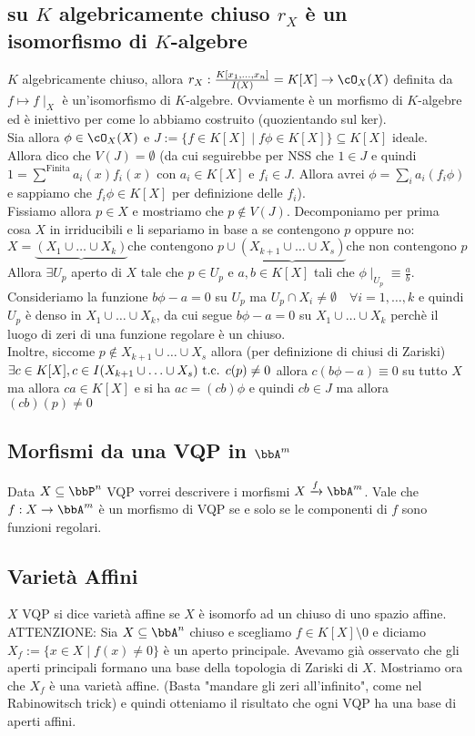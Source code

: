 \documentclass[a4paper,NoNotes,GeneralMath]{stdmdoc}
\newcommand{\xrar}{\xrightarrow}
\begin{document}
	\subsection*{su $K$ algebricamente chiuso $r_X$ è un isomorfismo di $K$-algebre}
	$K$ algebricamente chiuso, allora $r_X : \frac{K[x_1, \ldots, x_n]}{I(X)} = K[X] \rar \cO_X(X)$ definita da $f \mapsto f\mid_X$ è un'isomorfismo di $K$-algebre. Ovviamente è un morfismo di $K$-algebre ed è iniettivo per come lo abbiamo costruito (quozientando sul ker). \\
	Sia allora $\phi \in \cO_X(X)$ e $J := \{ f \in K[X] \mid f\phi \in K[X] \} \subseteq K[X]$ ideale. Allora dico che $V(J) = \emptyset$ (da cui seguirebbe per NSS che $1 \in J$ e quindi $1 = \sum^{\text{Finita}} a_i(x) f_i(x)$ con $a_i \in K[X]$ e $f_i \in J$. Allora avrei $\phi = \sum_i a_i (f_i\phi)$ e sappiamo che $f_i \phi \in K[X]$ per definizione delle $f_i$). \\
	Fissiamo allora $p \in X$ e mostriamo che $p \not\in V(J)$. Decomponiamo per prima cosa $X$ in irriducibili e li separiamo in base a se contengono $p$ oppure no: $$ X = \underbrace{(X_1 \cup \ldots \cup X_k)}{\text{che contengono }p} \cup \underbrace{(X_{k+1} \cup \ldots \cup X_s)}{\text{che non contengono }p} $$
	Allora $\exists U_p$ aperto di $X$ tale che $p \in U_p$ e $a, b \in K[X]$ tali che $\phi\mid_{U_p} \equiv \frac{a}{b}$. Consideriamo la funzione $b\phi - a = 0$ su $U_p$ ma $U_p \cap X_i \neq \emptyset \quad \forall i = 1, \ldots, k$ e quindi $U_p$ è denso in $X_1 \cup \ldots \cup X_k$, da cui segue $b\phi - a = 0$ su $X_1 \cup \ldots \cup X_k$ perchè il luogo di zeri di una funzione regolare è un chiuso. \\
	Inoltre, siccome $p \not\in X_{k+1} \cup \ldots \cup X_s$ allora (per definizione di chiusi di Zariski) $\exists c \in K[X], c \in I(X_{k+1} \cup \ldots \cup X_s) \mbox{ t.c. } c(p) \neq 0$ allora $c(b\phi -a) \equiv 0$ su tutto $X$ ma allora $ca \in K[X]$ e si ha $ac = (cb)\phi$ e quindi $cb \in J$ ma allora $(cb)(p) \neq 0$
	
	\subsection*{Morfismi da una VQP in $\bbA^m$}
	Data $X \subseteq \bbP^n$ VQP vorrei descrivere i morfismi $X \xrar{f} \bbA^m$. Vale che $f: X \rar \bbA^m$ è un morfismo di VQP se e solo se le componenti di $f$ sono funzioni regolari.
	
	\subsection*{Varietà Affini}
	$X$ VQP si dice varietà affine se $X$ è isomorfo ad un chiuso di uno spazio affine. \\
	ATTENZIONE: Sia $X \subseteq \bbA^n$ chiuso e scegliamo $f \in K[X] \setminus 0$ e diciamo $X_f := \{ x \in X \mid f(x) \neq 0 \}$ è un aperto principale. Avevamo già osservato che gli aperti principali formano una base della topologia di Zariski di $X$. Mostriamo ora che $X_f$ è una varietà affine. (Basta "mandare gli zeri all'infinito", come nel Rabinowitsch trick) e quindi otteniamo il risultato che ogni VQP ha una base di aperti affini.
	
\end{document}
